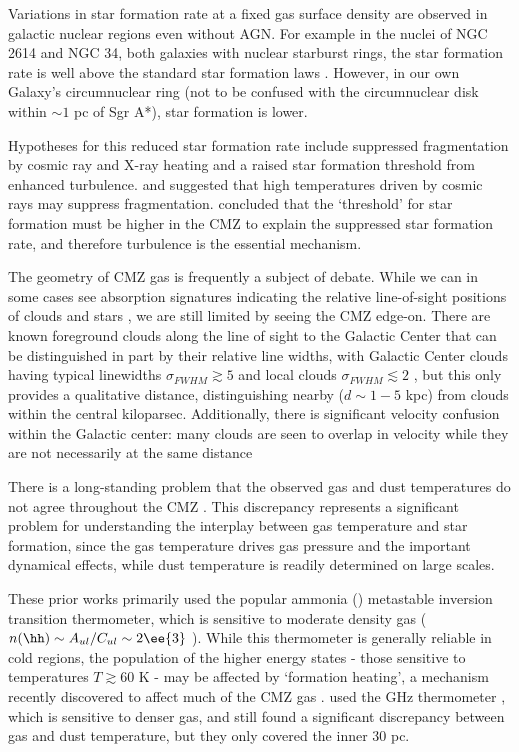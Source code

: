 Variations in star formation rate at a fixed gas surface density are observed
in galactic nuclear regions even without AGN.  For example in the nuclei of NGC
2614 and NGC 34, both galaxies with nuclear starburst rings, the star formation
rate is well above the standard star formation laws \citep{Xu2014b}.  However,
in our own Galaxy's circumnuclear ring (not to be confused with the
circumnuclear disk within $\sim1$ pc of Sgr A*), star formation is lower.

Hypotheses for this reduced star formation rate include suppressed
fragmentation by cosmic ray and X-ray heating and a raised star formation
threshold from enhanced turbulence.  \citet{Papadopoulos2010a} and
\citet{Papadopoulos2011a} suggested that high temperatures driven by cosmic
rays may suppress fragmentation.  \citet{Kruijssen2014c} concluded that the
`threshold' for star formation must be higher in the CMZ to explain the
suppressed star formation rate, and therefore turbulence is the essential
mechanism.  

The geometry of CMZ gas is frequently a subject of debate.  While we can in
some cases see absorption signatures indicating the relative line-of-sight
positions of clouds and stars \citep{Longmore2012b,Yusef-Zadeh2012a}, we are
still limited by seeing the CMZ edge-on.  There are known foreground clouds
along the line of sight to the Galactic Center that can be distinguished in
part by their relative line widths, with Galactic Center clouds having typical
linewidths $\sigma_{FWHM}\gtrsim5$ \kms and local clouds $\sigma_{FWHM}
\lesssim 2$ \kms, but this only provides a qualitative distance, distinguishing
nearby ($d\sim1-5$ kpc) from clouds within the central kiloparsec.  Additionally,
there is significant velocity confusion within the Galactic center: many clouds
are seen to overlap in velocity while they are not necessarily at the same distance
\citep{Jones2012a,Oka2012a}

There is a long-standing problem that the observed gas and dust temperatures do
not agree throughout the CMZ
\citep{Guesten1981a,Ao2013a,Ott2014a,Molinari2011a}.  This discrepancy
represents a significant problem for understanding the interplay between gas
temperature and star formation, since the gas temperature drives gas pressure
and the important dynamical effects, while dust temperature is readily
determined on large scales.

These prior works primarily used the popular ammonia (\ammonia) metastable
inversion transition thermometer, which is sensitive to moderate density gas
($n(\hh) \sim A_{ul}/C_{ul} \sim 2\ee{3}$ \percc).  While this thermometer is
generally reliable in cold regions, the population of the higher energy states
- those sensitive to temperatures $T\gtrsim60$ K - may be affected by
`formation heating', a mechanism recently discovered to affect much of the CMZ
gas \citep[][]{Lis2014a,Mills2013a}.  \citet{Ao2013a} used the  GHz
thermometer \citep{Mangum1993a}, which is sensitive to denser gas, and still
found a significant discrepancy between gas and dust temperature, but they only
covered the inner 30 pc.

